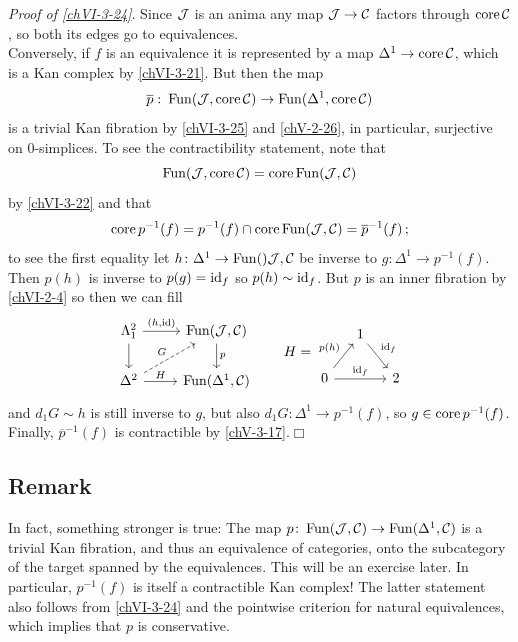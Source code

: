         \emph{Proof of \ref{chVI-3-24}}. Since $\mathcal{J}$ is an anima any map $\mathcal{J} \to \mathcal{C}$ factors through $\operatorname{core} \mathcal{C}$, so both its edges go to equivalences.\\
        Conversely, if $f$ is an equivalence it is represented by a map $\Delta^1 \to \operatorname{core} \mathcal{C}$, which is a Kan complex by \ref{chVI-3-21}. But then the map
        \begin{equation*}
            \overline{p} \,\colon \operatorname{Fun}(\mathcal{J}, \operatorname{core} \mathcal{C}) \to \operatorname{Fun}(\Delta^1, \operatorname{core} \mathcal{C})
        \end{equation*}
        is a trivial Kan fibration by \ref{chVI-3-25} and \ref{chV-2-26}, in particular, surjective on $0$-simplices. To see the contractibility statement, note that
        \begin{equation*}
            \operatorname{Fun}(\mathcal{J}, \operatorname{core} \mathcal{C}) = \operatorname{core} \operatorname{Fun}(\mathcal{J}, \mathcal{C})
        \end{equation*}
        by \ref{chVI-3-22} and that
        \begin{equation*}
            \operatorname{core} p^{-1}(f) = p^{-1}(f) \cap \operatorname{core} \operatorname{Fun}(\mathcal{J}, \mathcal{C}) = \overline{p}^{-1}(f) \,;
        \end{equation*}
        to see the first equality let $h \colon \Delta^1 \to \operatorname{Fun}()\mathcal{J}, \mathcal{C}$ be inverse to $g \colon \Delta^1 \to p^{-1}(f)$. Then $p(h)$ is inverse to $p(g) = \operatorname{id}_f$ so $p(h) \sim \operatorname{id}_f$. But $p$ is an inner fibration by \ref{chVI-2-4} so then we can fill
        \begin{equation*}
            \begin{tikzcd}
                \horn{2}{1} \arrow[d] \arrow[r, "{(h, \id)}"] & \Fun(\Jj, \Cc) \arrow[d, "p"] \\
                \Delta^2 \arrow[ur, dashed, "G"] \arrow[r, "H"] & \Fun(\Delta^1, \Cc)
            \end{tikzcd}
            \qquad
            H =
            \begin{tikzcd}[column sep=small]
                & 1 \arrow[dr, "\id_f"] & \\
                0 \arrow[ur, "{p(h)}"] \arrow[rr, "\id_f"] & & 2
            \end{tikzcd}
        \end{equation*}
        and $d_1 G \sim h$ is still inverse to $g$, but also $d_1 G \colon \Delta^1 \to p^{-1}(f)$, so $g \in \operatorname{core} p^{-1}(f)$.\\
        Finally, $\overline{p}^{-1}(f)$ is contractible by \ref{chV-3-17}.\hfill$\Box$

    \subsection{Remark}\label{chVI-3-26}
        In fact, something stronger is true: The map $p \colon \operatorname{Fun}(\mathcal{J}, \mathcal{C}) \to \operatorname{Fun}(\Delta^1, \mathcal{C})$ is a trivial Kan fibration, and thus an equivalence of categories, onto the subcategory of the target spanned by the equivalences. This will be an exercise later. In particular, $p^{-1}(f)$ is itself a contractible Kan complex! The latter statement also follows from \ref{chVI-3-24} and the pointwise criterion for natural equivalences, which implies that $p$ is conservative.
        \medskip

